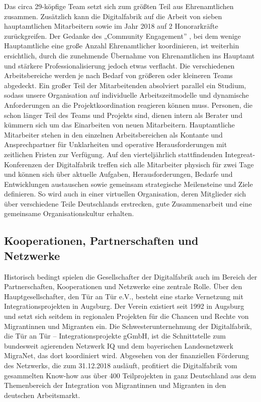\documentclass[12pt, a4paper]{article} %
\begin{document}
Das circa 29-köpfige Team setzt sich zum größten Teil aus Ehrenamtlichen
zusammen. Zusätzlich kann die Digitalfabrik auf die Arbeit von sieben
hauptamtlichen Mitarbeitern sowie im Jahr 2018 auf 2 Honorarkräfte
zurückgreifen. Der Gedanke des „Community Engagement” , bei dem wenige
Hauptamtliche eine große Anzahl Ehrenamtlicher koordinieren, ist
weiterhin ersichtlich, durch die zunehmende Übernahme von Ehrenamtlichen
ins Hauptamt und stärkere Professionalisierung jedoch etwas verflacht.
Die verschiedenen Arbeitsbereiche werden je nach Bedarf von größeren
oder kleineren Teams abgedeckt. Ein großer Teil der Mitarbeitenden
absolviert parallel ein Studium, sodass unsere Organisation auf
individuelle Arbeitszeitmodelle und dynamische Anforderungen an die
Projektkoordination reagieren können muss. Personen, die schon länger
Teil des Teams und Projekts sind, dienen intern als Berater und kümmern
sich um das Einarbeiten von neuen Mitarbeitern. Hauptamtliche
Mitarbeiter stehen in den einzelnen Arbeitsbereichen als Kontante und
Ansprechpartner für Unklarheiten und operative Herausforderungen mit
zeitlichen Fristen zur Verfügung. Auf den vierteljährlich stattfindenden
Integreat-Konferenzen der Digitalfabrik treffen sich alle Mitarbeiter
physisch für zwei Tage und können sich über aktuelle Aufgaben,
Herausforderungen, Bedarfe und Entwicklungen austauschen sowie gemeinsam
strategische Meilensteine und Ziele definieren. So wird auch in einer
virtuellen Organisation, deren Mitglieder sich über verschiedene Teile
Deutschlands erstrecken, gute Zusammenarbeit und eine gemeinsame
Organisationskultur erhalten.

\hypertarget{kooperationen-partnerschaften-und-netzwerke}{%
\subsection{Kooperationen, Partnerschaften und
Netzwerke}\label{kooperationen-partnerschaften-und-netzwerke}}

Historisch bedingt spielen die Gesellschafter der Digitalfabrik auch im
Bereich der Partnerschaften, Kooperationen und Netzwerke eine zentrale
Rolle. Über den Hauptgesellschafter, den Tür an Tür e.V., besteht eine
starke Vernetzung mit Integrationsprojekten in Augsburg. Der Verein
existiert seit 1992 in Augsburg und setzt sich seitdem in regionalen
Projekten für die Chancen und Rechte von Migrantinnen und Migranten ein.
Die Schwesterunternehmung der Digitalfabrik, die Tür an Tür –
Integrationsprojekte gGmbH, ist die Schnittstelle zum bundesweit
agierenden Netzwerk IQ und dem bayerischen Landesnetzwerk MigraNet, das
dort koordiniert wird. Abgesehen von der finanziellen Förderung des
Netzwerks, die zum 31.12.2018 ausläuft, profitiert die Digitalfabrik vom
gesammelten Know-how aus über 400 Teilprojekten in ganz Deutschland aus
dem Themenbereich der Integration von Migrantinnen und Migranten in den
deutschen Arbeitsmarkt.
\end{document}
